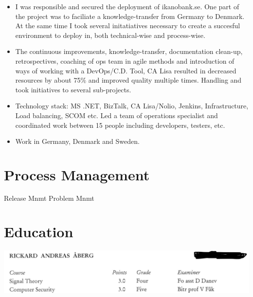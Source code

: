 \documentclass[11pt,a4paper,sans]{moderncv}
\begin{document}
\begin{itemize}
    \item I was responsible and secured the deployment of ikanobank.se. One part of the project was to faciliate a knowledge-transfer from Germany to Denmark. At the same time I took several initatiatives necessary to create a succesful environment to deploy in, both technical-wise and process-wise. 
    
    \item The continuous improvements, knowledge-transfer, documentation clean-up, retrospectives, coaching of ops team in agile methods and introduction of ways of working with a DevOps/C.D. Tool, CA Lisa resulted in decreased resources by about 75\% and improved quality multiple times. Handling and took initiatives to several sub-projects. 
    
    \item Technology stack: MS .NET, BizTalk, CA Lisa/Nolio, Jenkins, Infrastructure, Load balancing, SCOM etc. Led a team of operations specialist and coordinated work between 15 people including developers, testers, etc. 
    
    \item Work in Germany, Denmark and Sweden. 
\end{itemize}

\section{Process Management}
 {Release Mnmt}
 {Problem Mnmt}


\section{Education}
\includegraphics[scale=0.4]{./images/it-security}
\end{document}
